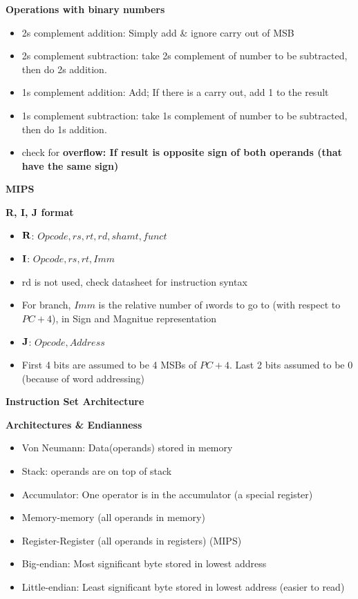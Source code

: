 \documentclass[a4paper]{article} \usepackage[backend=biber, style=numeric, sorting=none]{biblatex}
\begin{document}
\begin{multicols*}{4}
\textbf{Operations with binary numbers}
\begin{itemize}[leftmargin=*]
\itemsep -0.5em
\item 2s complement addition: Simply add \& ignore carry out of MSB
\item 2s complement subtraction: take 2s complement of number to be subtracted, then do 2s addition.
\item 1s complement addition: Add; If there is a carry out, add 1 to the result
\item 1s complement subtraction: take 1s complement of number to be subtracted, then do 1s addition.
\item check for \bf{overflow}: If result is opposite sign of both operands (that have the same sign)
\end{itemize}

{\small\textbf{MIPS}}

\textbf{R, I, J format}
\begin{itemize}[leftmargin=*]
\itemsep -0.5em
\item $\bf{R}$: $Opcode, rs, rt, rd, shamt, funct$
\item $\bf{I}$: $Opcode, rs, rt, Imm$
\item rd is not used, check datasheet for instruction syntax
\item For branch, $Imm$ is the relative number of \i{words} to go to (with respect to $PC + 4$), in Sign and Magnitue representation
\item $\bf{J}$: $Opcode, Address$
\item First 4 bits are assumed to be 4 MSBs of $PC + 4$. Last 2 bits assumed to be 0 (because of word addressing)
\end{itemize}

{\small\textbf{Instruction Set Architecture}}

\textbf{Architectures \& Endianness}
\begin{itemize}[leftmargin=*]
\itemsep -0.5em
\item Von Neumann: Data(operands) stored in memory
\item Stack: operands are on top of stack
\item Accumulator: One operator is in the accumulator (a special register)
\item Memory-memory (all operands in memory)
\item Register-Register (all operands in registers) (MIPS)
\item Big-endian: Most significant byte stored in lowest address
\item Little-endian: Least significant byte stored in lowest address (easier to read)
\end{itemize}


\end{multicols*}
\end{document}
